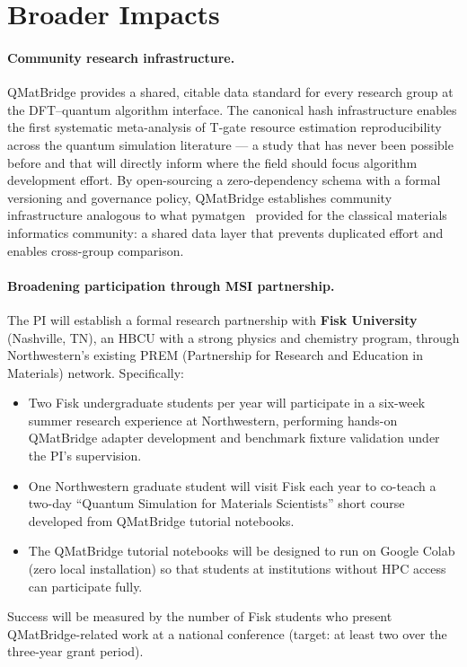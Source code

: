\documentclass[11pt]{article}
\begin{document}
\section{Broader Impacts}

\paragraph{Community research infrastructure.}
QMatBridge provides a shared, citable data standard for every research
group at the DFT--quantum algorithm interface.
The canonical hash infrastructure enables the first systematic
meta-analysis of T-gate resource estimation reproducibility across the
quantum simulation literature --- a study that has never been possible
before and that will directly inform where the field should focus
algorithm development effort.
By open-sourcing a zero-dependency schema with a formal versioning
and governance policy, QMatBridge establishes community infrastructure
analogous to what pymatgen~\cite{Ong2013} provided for the classical
materials informatics community: a shared data layer that prevents
duplicated effort and enables cross-group comparison.

\paragraph{Broadening participation through MSI partnership.}
The PI will establish a formal research partnership with
\textbf{Fisk University} (Nashville, TN), an HBCU with a strong
physics and chemistry program, through Northwestern's existing PREM
(Partnership for Research and Education in Materials) network.
Specifically:
\begin{itemize}[leftmargin=1.5em, itemsep=1pt]
  \item Two Fisk undergraduate students per year will participate in a
    six-week summer research experience at Northwestern, performing
    hands-on QMatBridge adapter development and benchmark fixture
    validation under the PI's supervision.
  \item One Northwestern graduate student will visit Fisk each year to
    co-teach a two-day ``Quantum Simulation for Materials Scientists''
    short course developed from QMatBridge tutorial notebooks.
  \item The QMatBridge tutorial notebooks will be designed to run on
    Google Colab (zero local installation) so that students at
    institutions without HPC access can participate fully.
\end{itemize}
Success will be measured by the number of Fisk students who present
QMatBridge-related work at a national conference (target: at least
two over the three-year grant period).
\end{document}
